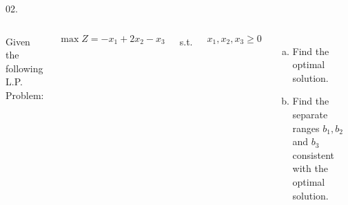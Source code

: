 \begin{frameExample}{02.}{}
\begin{columns}
  Given the following L.P. Problem:

  \[ \max Z = -x_1 + 2x_2 - x_3 \]

  \vspace{6mm}
  s.t.

  \vspace{6mm}

  $x_1, x_2, x_3 \geq 0$
  \begin{enumerate}[a)] \justifying \parskip3mm
  \item Find the optimal solution.
  \item   Find the separate ranges $b_1, b_2 $ and $b_3$ consistent with the optimal solution.
  \end{enumerate}
\end{columns}  
\end{frameExample}


